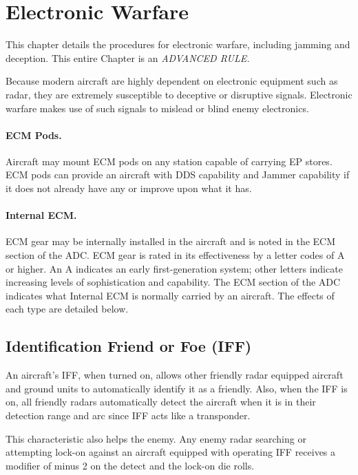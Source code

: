 \section{Electronic Warfare}

This chapter details the procedures for electronic warfare, including jamming and deception. This entire Chapter is an \emph{ADVANCED RULE.}

Because modern aircraft are highly dependent on electronic equipment such as radar, they are extremely susceptible to deceptive or disruptive signals.  Electronic warfare makes use of such signals to mislead or blind enemy electronics.

\paragraph{ECM Pods.} Aircraft may mount ECM pods on any station capable of carrying EP stores. ECM pods can provide an aircraft with DDS capability and Jammer capability if it does not already have any or improve upon what it has.  

\paragraph{Internal ECM.} ECM gear may be internally installed in the aircraft and is noted in the ECM section of the ADC. ECM gear is rated in its effectiveness by a letter codes of A or higher. An A indicates an early first-generation system; other letters indicate increasing levels of sophistication and capability. The ECM section of the ADC indicates what Internal ECM is normally carried by an aircraft. The effects of each type are detailed below.

\subsection{Identification Friend or Foe (IFF)}

An aircraft's IFF, when turned on, allows other friendly radar equipped aircraft and ground units to automatically identify it as a friendly. Also, when the IFF is on, all friendly radars automatically detect the aircraft when it is in their detection range and arc since IFF acts like a transponder.

This characteristic also helps the enemy. Any enemy radar searching or attempting lock-on against an aircraft equipped with operating IFF receives a modifier of minus 2 on the detect and the lock-on die rolls.

